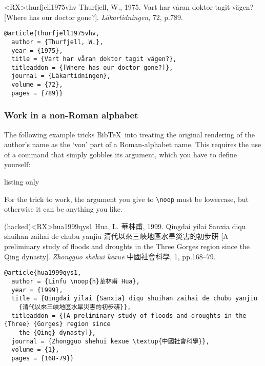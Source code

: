 \documentclass[10pt,a4paper]{article}
\newenvironment{tips}{%
  \begin{list}{\makebox[2em][c]{\faLightbulbO}}{%
    \setlength{\leftmargin}{2em}
    \setlength{\labelwidth}{2em}
    \setlength{\labelsep}{0pt}}
}{\end{list}}
\begin{document}
\begin{bibexbox}<RX>{thurfjell1975vhv}
  Thurfjell, W., 1975. Vart har våran doktor tagit vägen? [Where has our doctor gone?]. \emph{Läkartidningen}, 72, p.789.
  \tcblower
\begin{Verbatim}
@article{thurfjell1975vhv,
  author = {Thurfjell, W.},
  year = {1975},
  title = {Vart har våran doktor tagit vägen?},
  titleaddon = {[Where has our doctor gone?]},
  journal = {Läkartidningen},
  volume = {72},
  pages = {789}}
\end{Verbatim}
\end{bibexbox}

\subsubsection*{Work in a non-Roman alphabet}

\begin{tips}
\item
The following example tricks Bib\TeX\ into treating the original rendering of the author's name as the `von' part of a Roman-alphabet name. This requires the use of a command that simply gobbles its argument, which you have to define yourself:

\begin{tcblisting}{listing only}
\newcommand*{\noop}[1]{}
\end{tcblisting}

For the trick to work, the argument you give to \lstinline[style=dtxlatex]|\noop| must be lowercase, but otherwise it can be anything you like.
\end{tips}

\newcommand*{\noop}[1]{}
\begin{bibexbox}(hacked)<RX>{hua1999qys1}
  Hua, L. 華林甫, 1999.  Qingdai yilai Sanxia diqu shuihan zaihai de chubu yanjiu 清代以來三峽地區水旱災害的初步硏 [A preliminary study of floods and droughts in the Three Gorges region since the Qing dynasty]. \emph{Zhongguo shehui kexue} 中國社會科學, 1, pp.168--79.
  \tcblower
\begin{Verbatim}
@article{hua1999qys1,
  author = {Linfu \noop{h}華林甫 Hua},
  year = {1999},
  title = {Qingdai yilai {Sanxia} diqu shuihan zaihai de chubu yanjiu
    {清代以來三峽地區水旱災害的初步硏}},
  titleaddon = {[A preliminary study of floods and droughts in the {Three} {Gorges} region since
    the {Qing} dynasty]},
  journal = {Zhongguo shehui kexue \textup{中國社會科學}},
  volume = {1},
  pages = {168-79}}
\end{Verbatim}
\end{bibexbox}
\end{document}
